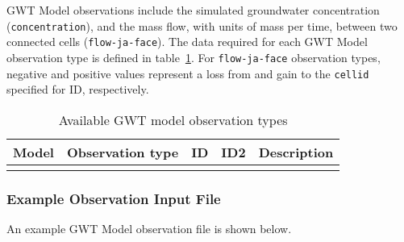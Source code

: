 
GWT Model observations include the simulated groundwater concentration (\texttt{concentration}), and the mass flow, with units of mass per time, between two connected cells (\texttt{flow-ja-face}). The data required for each GWT Model observation type is defined in table~\ref{table:gwtobstype}. For \texttt{flow-ja-face} observation types, negative and positive values represent a loss from and gain to the \texttt{cellid} specified for ID, respectively.

\begin{longtable}{p{2cm} p{2.75cm} p{2cm} p{1.25cm} p{7cm}}
\caption{Available GWT model observation types} \tabularnewline

\hline
\hline
\textbf{Model} & \textbf{Observation type} & \textbf{ID} & \textbf{ID2} & \textbf{Description} \\
\hline
\endhead

\hline
\endfoot


\label{table:gwtobstype}
\end{longtable}

\vspace{5mm}
\subsubsection{Example Observation Input File}

An example GWT Model observation file is shown below.




